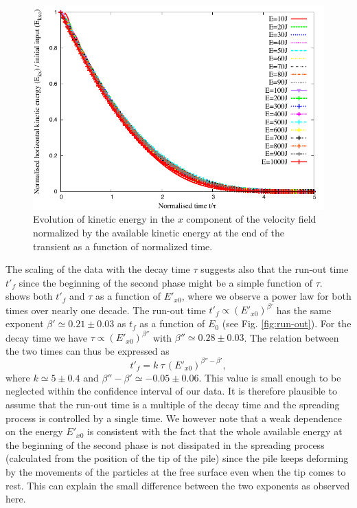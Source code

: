 \begin{figure}[tbhp]
\centering
\includegraphics[width=\textwidth]{EkxKoTTau_Slope}
\caption{Evolution of kinetic energy in the $x$ component of 
the velocity field  normalized by the available kinetic energy at the end of 
the transient as a function of normalized time.}
\label{fig:ExEx0_vs_ttau}
\end{figure}


The scaling of the data with the decay time $\tau$ suggests also that the 
run-out time $t'_f$ since the beginning of the second phase might be a simple 
function of $\tau$.~ shows both $t'_f$ and $\tau$ as 
a function of $E'_{x0}$, where we observe a power law for both times over 
nearly one decade. The run-out time $t'_f \propto (E'_{x0})^{\beta'}$ has the 
same exponent $\beta' \simeq 0.21 \pm 0.03$ as $t_f$ as a function of $E_0$ 
(see Fig. \ref{fig:run-out}). For the decay time we have 
$\tau \propto (E'_{x0})^{\beta''}$ with $\beta'' \simeq 0.28 \pm 0.03$. The 
relation between the two times can thus be expressed as 
\begin{equation}
t'_f = k  \ \tau \, (E'_{x0})^{\beta'' - \beta'}, 
\label{eqn:t'f}
\end{equation}
where $k \simeq 5 \pm 0.4$ and $\beta'' - \beta' \simeq -0.05 \pm 0.06$. This 
value is small enough to be neglected within the confidence interval of our 
data. It is therefore plausible to assume that  the run-out time is a multiple 
of the decay time and the spreading process is controlled by a single time. We 
however note that a weak dependence on the energy $E'_{x0}$  is consistent with 
the fact that the whole available energy at the beginning of the second phase 
is not dissipated in the spreading process (calculated from the position of the 
tip of the pile) since  the pile keeps deforming by the movements of the 
particles at the free surface even when the tip comes to rest. 
This can explain the small difference between the two exponents as observed 
here.


